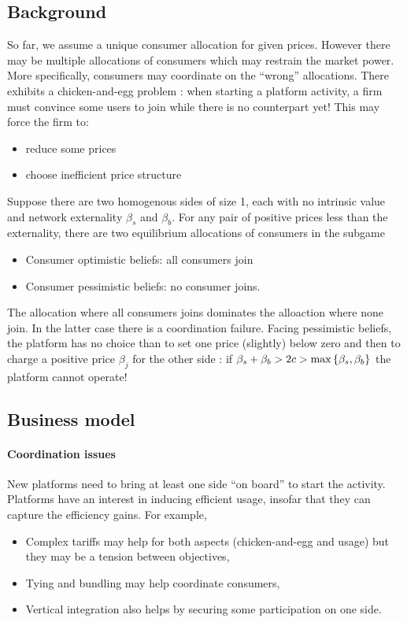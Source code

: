 \subsection{Background}
So far, we assume a unique consumer allocation for given prices. However there may be multiple allocations of consumers which may restrain the market power. More specifically, consumers may coordinate on the ``wrong'' allocations. There exhibits a chicken-and-egg problem : when starting a platform activity, a firm must convince some users to join while there is no counterpart yet! This may force the firm to: \begin{itemize}
    \item reduce some prices
    \item choose inefficient price structure
\end{itemize}
Suppose there are two homogenous sides of size 1, each with no intrinsic value and network externality $\beta_s$ and $\beta_b$. For any pair of positive prices less than the externality, there are two equilibrium allocations of consumers in the subgame 
\begin{itemize}
    \item Consumer optimistic beliefs: all consumers join
    \item Consumer pessimistic beliefs: no consumer joins.
\end{itemize}
The allocation where all consumers joins dominates the alloaction where none join. In the latter case there is a coordination failure.
Facing pessimistic beliefs, the platform has no choice than to set one price (slightly) below zero and then to charge a positive price $\beta_j$ for the other side : if $\beta_s+\beta_b>2c>\max \left\{\beta_s,\beta_b\right\}$ the platform cannot operate!
\subsection{Business model}
\paragraph{Coordination issues} New platforms need to bring at
least one side “on board” to start the activity. Platforms have an interest in inducing efficient usage, insofar that they can capture the efficiency gains. For example, \begin{itemize}
    \item Complex tariffs may help for both aspects (chicken-and-egg and usage) but they may be a tension between objectives,
    \item Tying and bundling may help coordinate consumers,
    \item Vertical integration also helps by securing some participation on one side.
\end{itemize}
